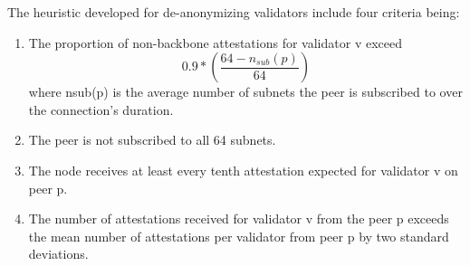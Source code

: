 The heuristic developed for de-anonymizing validators include four criteria being:
\begin{enumerate}
    \item The proportion of non-backbone attestations for validator v exceed
    \begin{equation}
        0.9*\left(\frac{64-n_{sub}(p)}{64}\right)
        \label{eq:heurestic}
    \end{equation} where nsub(p) is the average number of subnets the peer is subscribed to over the connection’s duration.
    \item The peer is not subscribed to all 64 subnets.
    \item The node receives at least every tenth attestation expected for validator v on peer p.
    \item The number of attestations received for validator v from the peer p exceeds the mean number of attestations per validator from peer p by two standard deviations.
\end{enumerate}